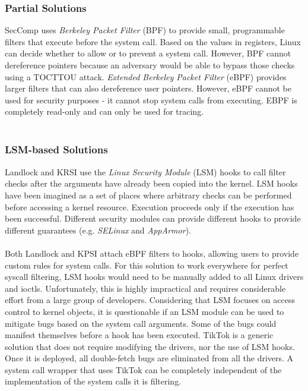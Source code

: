 \subsubsection{Partial Solutions}
SecComp\cite{seccomp} uses \emph{Berkeley Packet Filter} (BPF) to provide small,
programmable filters that execute before the system call. Based on the values
in registers, Linux can decide whether to allow or to prevent a system call.
However, BPF cannot dereference pointers because an adversary would be able to
bypass those checks using a TOCTTOU attack. \emph{Extended Berkeley Packet
Filter} (eBPF)\cite{ebpf} provides larger filters that can also dereference
user pointers. However, eBPF cannot be used for security purposes - it cannot
stop system calls from executing. EBPF is completely read-only and can only be
used for tracing.
\\
\\
\subsubsection{LSM-based Solutions}
Landlock\cite{landlock} and KRSI\cite{krsi} use the \emph{Linux Security Module}
\cite{morris2002linux} (LSM) hooks to call filter checks after the arguments
have already been copied into the kernel. LSM hooks have been imagined as a set
of places where arbitrary checks can be performed before accessing a kernel
resource. Execution proceeds only if the execution has been successful.
Different security modules can provide different hooks to provide different
guarantees (e.g. \emph{SELinux}\cite{smalley2001implementing} and
\emph{AppArmor}\cite{gruenbacher2007apparmor}).
\\
\\
Both Landlock and KPSI attach eBPF filters to hooks, allowing users to provide
custom rules for system calls. For this solution to work everywhere for perfect
syscall filtering, LSM hooks would need to be manually added to all Linux
drivers and ioctls. Unfortunately, this is highly impractical and requires
considerable effort from a large group of developers. Considering that LSM
focuses on access control to kernel objects, it is questionable if an LSM module
can be used to mitigate bugs based on the system call arguments. Some of the
bugs could manifest themselves before a hook has been executed. TikTok is a
generic solution that does not require modifying the drivers, nor the use of
LSM hooks. Once it is deployed, all double-fetch bugs are eliminated from all
the drivers. A system call wrapper that uses TikTok can be completely
independent of the implementation of the system calls it is filtering.

